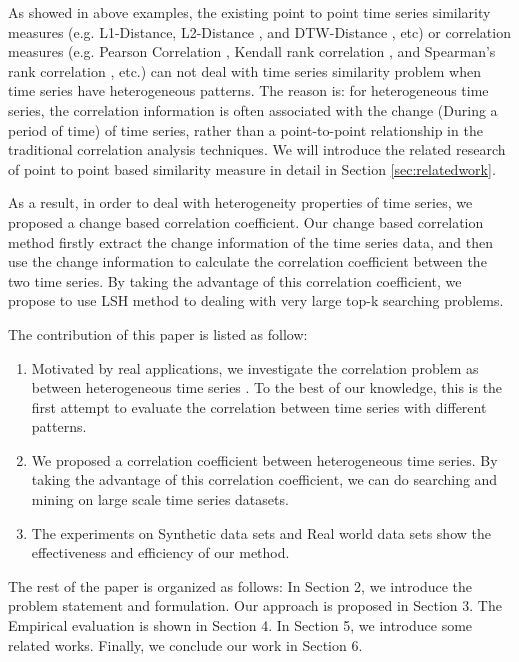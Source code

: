 As showed in above examples, the existing point to point time series similarity measures (e.g. L1-Distance, L2-Distance \cite{han2011data}, and DTW-Distance \cite{muller2007dynamic}, etc) or correlation measures (e.g. Pearson Correlation \cite{pearson1904mathematical}, Kendall rank correlation \cite{kendall1938new}, and Spearman's rank correlation \cite{pirie1988spearman}, etc.) can not deal with time series similarity problem when time series have heterogeneous patterns. 
The reason is: for heterogeneous time series, the correlation information is often associated with the change (During a period of time) of time series, rather than a point-to-point relationship in the traditional correlation analysis techniques. We will introduce the related research of point to point based similarity measure in detail in Section \ref{sec:relatedwork}.

As a result, in order to deal with heterogeneity properties of time series, we proposed a change based correlation coefficient. 
Our change based correlation method firstly extract the change information of the time series data, and then use the change information to calculate the correlation coefficient between the two time series.
By taking the advantage of this correlation coefficient, we propose to use LSH method to dealing with very large top-k searching problems.

The contribution of this paper is listed as follow:
\begin{enumerate}
\item Motivated by real applications, we investigate the correlation
problem as between heterogeneous time series .
To the best of our knowledge, this is the first attempt
to evaluate the correlation between time series with different patterns.

\item We proposed a correlation coefficient between heterogeneous time series. By taking the advantage of this correlation coefficient, we can do searching and mining on large scale time series datasets.


\item The experiments on Synthetic data sets and Real world data sets show the effectiveness and efficiency of our method.
\end{enumerate}

The rest of the paper is organized as follows: In Section 2, we introduce the problem
statement and formulation. Our approach is proposed in Section 3. The Empirical evaluation is shown in Section 4. In Section 5, we introduce some
related works. Finally, we conclude our work in Section 6.



